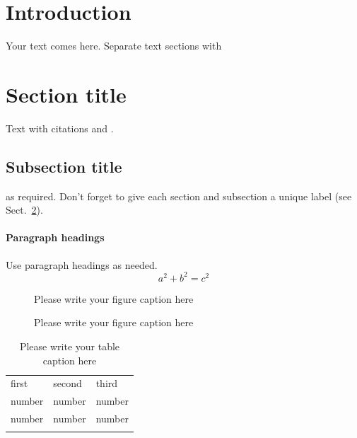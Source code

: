%
%



\section{Introduction}
\label{intro}
Your text comes here. Separate text sections with
\section{Section title}
\label{sec:1}
Text with citations \cite{RefB} and \cite{RefJ}.
\subsection{Subsection title}
\label{sec:2}
as required. Don't forget to give each section
and subsection a unique label (see Sect.~\ref{sec:1}).
\paragraph{Paragraph headings} Use paragraph headings as needed.
\begin{equation}
a^2+b^2=c^2
\end{equation}

\begin{figure}
\caption{Please write your figure caption here}
\label{fig:1}       %
\end{figure}
%
\begin{figure}
\caption{Please write your figure caption here}
\label{fig:2}       %
\end{figure}
%
\begin{table}
\caption{Please write your table caption here}
\label{tab:1}       %
\begin{tabular}{lll}
\hline\noalign{\smallskip}
first & second & third  \\
\noalign{\smallskip}\hline\noalign{\smallskip}
number & number & number \\
number & number & number \\
\noalign{\smallskip}\hline
\end{tabular}
\end{table}


